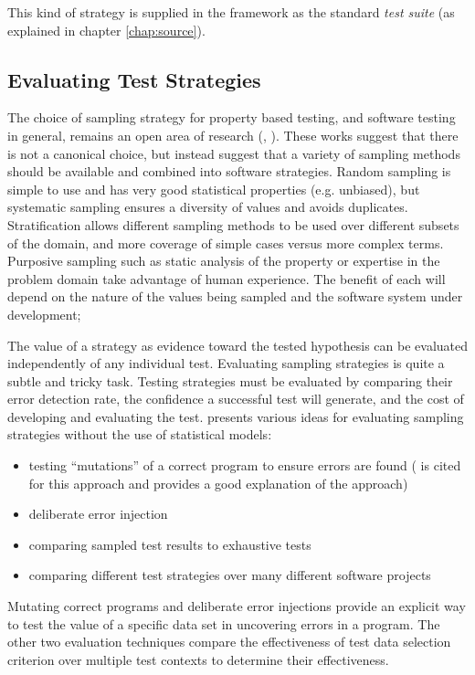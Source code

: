 \noindent
This kind of strategy is supplied in the \GC framework as the standard \emph{test suite}
(as explained in chapter \ref{chap:source}).

\subsection{Evaluating Test Strategies}

The choice of sampling strategy for property based testing,
and software testing in general,
remains an open area of research
(\cite{ZhuHallMay1997}, \cite{Hieronsetal2009}).
These works suggest that there is not a canonical choice,
but instead suggest that a variety of sampling methods 
should be available and combined into software strategies.
Random sampling is simple to use and has very good statistical properties (e.g. unbiased),
but systematic sampling ensures a diversity of values and avoids duplicates.
Stratification allows different sampling methods to be used 
over different subsets of the domain,
and more coverage of simple cases versus more complex terms.
Purposive sampling such as static analysis of the property
or expertise in the problem domain take advantage of human experience.
The benefit of each will depend on 
the nature of the values being sampled and 
the software system under development;

The value of a strategy as evidence toward the tested hypothesis
can be evaluated independently of any individual test.
Evaluating sampling strategies is quite a subtle and tricky task.
Testing strategies must be evaluated by comparing their error detection rate,
the confidence a successful test will generate,
and the cost of developing and evaluating the test.
\cite{WeyukerEtal1991} presents various ideas for evaluating sampling strategies
without the use of statistical models:

\begin{itemize}
\item testing ``mutations'' of a correct program to ensure errors are found
(\cite{BuddEtal1980} is cited for this approach and provides a good explanation of the approach)
\item deliberate error injection
\item comparing sampled test results to exhaustive tests
\item comparing different test strategies over many different software projects
\end{itemize}

\noindent
Mutating correct programs and deliberate error injections
provide an explicit way to test the value of a specific data set
in uncovering errors in a program.
The other two evaluation techniques compare the effectiveness
of test data selection criterion over multiple test contexts to determine
their effectiveness.

